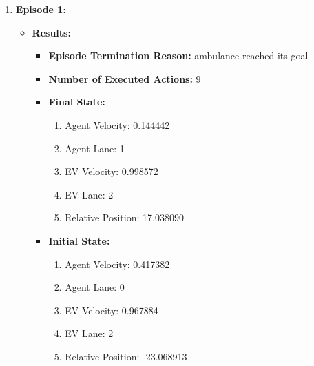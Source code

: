 \begin{enumerate}
    \item \textbf{Episode 1}:
    \begin{itemize}
        \item \textbf{Results:}
    \begin{itemize}
        \item \textbf{Episode Termination Reason:} ambulance reached its goal
        \item \textbf{Number of Executed Actions:} 9
        \item \textbf{Final State:}
        \begin{enumerate}
            \item Agent Velocity: 0.144442
            \item Agent Lane: 1
            \item EV Velocity: 0.998572
            \item EV Lane: 2
            \item Relative Position: 17.038090
        \end{enumerate}
        \item \textbf{Initial State:}
        \begin{enumerate}
            \item Agent Velocity: 0.417382
            \item Agent Lane: 0
            \item EV Velocity: 0.967884
            \item EV Lane: 2
            \item Relative Position: -23.068913
        \end{enumerate}
    \end{itemize}
    

\end{itemize}
\end{enumerate}
